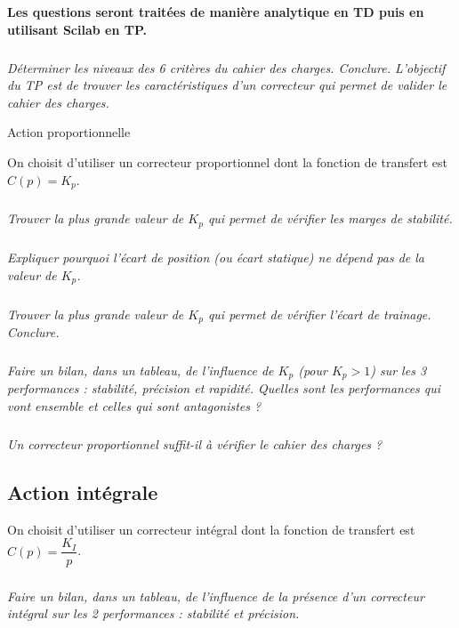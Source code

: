 \documentclass[10pt,fleqn]{article} %
\begin{document}
\begin{multicols}{2}
\textbf{Les questions seront traitées de manière analytique en TD puis en utilisant Scilab en TP.}


\subparagraph{}
\textit{Déterminer les niveaux des 6 critères du cahier des charges. Conclure.
L’objectif du TP est de trouver les caractéristiques d’un correcteur qui permet de valider le cahier des charges.}
\ifprof
\begin{corrige}
\end{corrige}
\else
\fi

Action proportionnelle

On choisit d’utiliser un correcteur proportionnel dont la fonction de transfert est $C(p)=K_p$.
\subparagraph{}
\textit{Trouver la plus grande valeur de $K_p$ qui permet de vérifier les marges de stabilité.}
\ifprof
\begin{corrige}
\end{corrige}
\else
\fi

\subparagraph{}
\textit{Expliquer pourquoi l’écart de position (ou écart statique) ne dépend pas de la valeur de $K_p$.}
\ifprof
\begin{corrige}
\end{corrige}
\else
\fi

\subparagraph{}
\textit{Trouver la plus grande valeur de $K_p$ qui permet de vérifier l'écart de trainage. Conclure.}
\ifprof
\begin{corrige}
\end{corrige}
\else
\fi

\subparagraph{}
\textit{Faire un bilan, dans un tableau, de l’influence de $K_p$ (pour $K_p>1$) sur les 3 performances : stabilité, précision et rapidité. Quelles sont les performances qui vont ensemble et celles qui sont antagonistes ?}
\ifprof
\begin{corrige}
\end{corrige}
\else
\fi

\subparagraph{}
\textit{Un correcteur proportionnel suffit-il à vérifier le cahier des charges ?}
\ifprof
\begin{corrige}
\end{corrige}
\else
\fi

\subsection*{Action intégrale}
On choisit d’utiliser un correcteur intégral dont la fonction de transfert est  $C(p)=\dfrac{K_I}{p}$.
\subparagraph{}
\textit{Faire un bilan, dans un tableau, de l’influence de la présence d’un correcteur intégral sur les 2 performances : stabilité et précision.}
\ifprof
\begin{corrige}
\end{corrige}
\else
\fi


\end{multicols}
\end{document}
